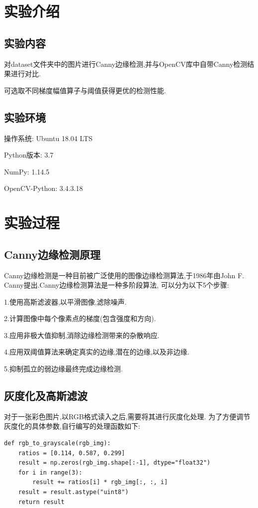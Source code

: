 \documentclass[a4paper]{article}
\begin{document}
    \tableofcontents
    \newpage
    \section{实验介绍}
        \subsection{实验内容}
对dataset文件夹中的图片进行Canny边缘检测,并与OpenCV库中自带Canny检测结果进行对比.

可选取不同梯度幅值算子与阈值获得更优的检测性能.
        \subsection{实验环境}
操作系统: Ubuntu 18.04 LTS

Python版本: 3.7

NumPy: 1.14.5

OpenCV-Python: 3.4.3.18
    \newpage
    \section{实验过程}
        \subsection{Canny边缘检测原理}
Canny边缘检测是一种目前被广泛使用的图像边缘检测算法,于1986年由John F. Canny提出.Canny边缘检测算法是一种多阶段算法,
可以分为以下5个步骤:

1.使用高斯滤波器,以平滑图像,滤除噪声.

2.计算图像中每个像素点的梯度(包含强度和方向).

3.应用非极大值抑制,消除边缘检测带来的杂散响应.

4.应用双阈值算法来确定真实的边缘,潜在的边缘,以及非边缘.

5.抑制孤立的弱边缘最终完成边缘检测.


    \subsection{灰度化及高斯滤波}
    \label{gaussian}
对于一张彩色图片,以RGB格式读入之后,需要将其进行灰度化处理. 为了方便调节灰度化的具体参数,自行编写的处理函数如下:
\begin{verbatim}
def rgb_to_grayscale(rgb_img):
    ratios = [0.114, 0.587, 0.299]
    result = np.zeros(rgb_img.shape[:-1], dtype="float32")
    for i in range(3):
        result += ratios[i] * rgb_img[:, :, i]
    result = result.astype("uint8")
    return result
\end{verbatim}
\end{document}
